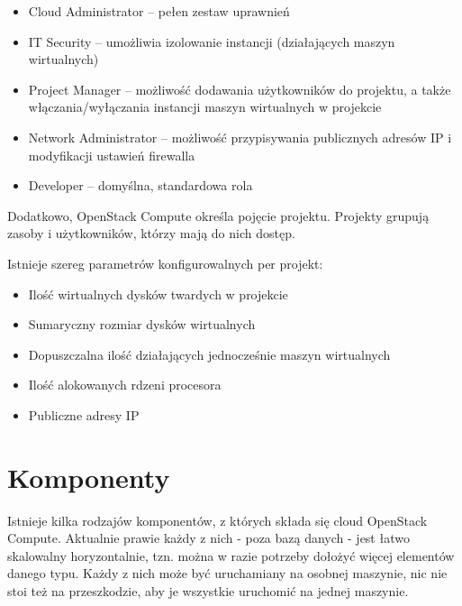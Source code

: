 \begin{itemize}
\item Cloud Administrator -- pełen zestaw uprawnień
\item IT Security -- umożliwia izolowanie instancji (działających maszyn wirtualnych)
\item Project Manager -- możliwość dodawania użytkowników do projektu, a także włączania/wyłączania instancji maszyn wirtualnych w projekcie
\item Network Administrator -- możliwość przypisywania publicznych adresów IP i modyfikacji ustawień firewalla
\item Developer -- domyślna, standardowa rola
\end{itemize}

Dodatkowo, OpenStack Compute określa pojęcie projektu. Projekty grupują zasoby i użytkowników, którzy mają do nich dostęp.

Istnieje szereg parametrów konfigurowalnych per projekt\cite{nova_manual}:

\begin{itemize}
\item Ilość wirtualnych dysków twardych w projekcie
\item Sumaryczny rozmiar dysków wirtualnych
\item Dopuszczalna ilość działających jednocześnie maszyn wirtualnych
\item Ilość alokowanych rdzeni procesora
\item Publiczne adresy IP
\end{itemize}

\section{Komponenty}

Istnieje kilka rodzajów komponentów, z których składa się cloud OpenStack Compute\cite{nova_manual}.
Aktualnie prawie każdy z nich - poza bazą danych - jest łatwo skalowalny horyzontalnie, tzn. można w razie potrzeby dołożyć więcej elementów danego typu. Każdy z nich może być uruchamiany na osobnej maszynie, nic nie stoi też na przeszkodzie, aby je wszystkie uruchomić na jednej maszynie.

